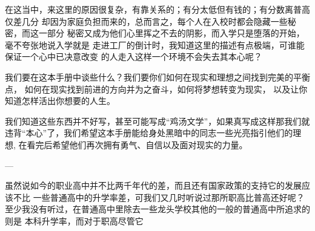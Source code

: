 \documentclass{article}
\begin{document}
在这当中，来这里的原因很复杂，有靠关系的；有分太低但有钱的；有分数离普高仅差几分
却因为家庭负担而来的，总而言之，每个人在入校时都会隐藏一些秘密，而这一部分
秘密又成为他们心里挥之不去的阴影，而入学只是堕落的开始，毫不夸张地说入学就是
走进工厂的倒计时，我知道这里的描述有点极端，可谁能保证一个心中已决意改变
的人走入这样一个环境不会失去其本心呢？

我们要在这本手册中谈些什么？我们要你们如何在现实和理想之间找到完美的平衡点，
如何在现实找到前进的方向并为之奋斗，如何将梦想转变为现实，
以及让你知道怎样活出你想要的人生。

我们知道这些东西并不好写，甚至可能写成“鸡汤文学”，如果真写成这样那我们就
违背“本心”了，我们希望这本手册能给身处黑暗中的同志一些光亮指引他们的理想,
在看完后希望他们再次拥有勇气、自信以及面对现实的力量。

---

虽然说如今的职业高中并不比两千年代的差，而且还有国家政策的支持它的发展应该不比
一些普通高中的升学率差，可我们又几时听说过那所职高比普高还好呢？
至少我没有听过，在普通高中里除去一些龙头学校其他的一般的普通高中所追求的则是
本科升学率，而对于职高尽管它

\newpage
\tableofcontents


\end{document}
